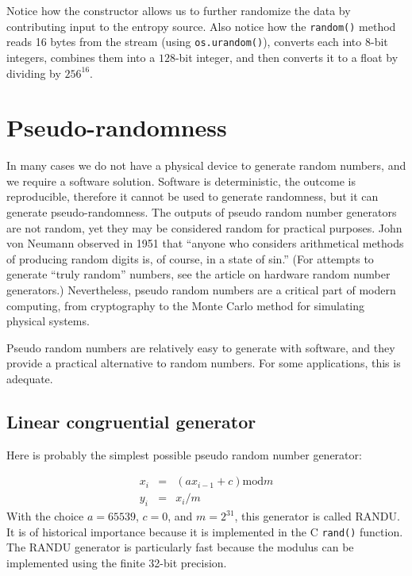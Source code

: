 \documentclass[justified, sixbynine]{tufte-book}
\def\ft{\small\tt}
\theoremstyle{plain}%
\newtheorem * {corollary}{Corollary}
\theoremstyle{definition}
\theoremstyle{remark}
\newtheorem * {remark}{Remark}
\newtheorem * {note}{Note}
\begin{document}
\begin{fullwidth}
Notice how the constructor allows us to further randomize the data by contributing input to the entropy source. Also notice how the {\ft random()} method reads 16 bytes from the stream (using {\ft os.urandom()}), converts each into $8$-bit integers, combines them into a $128$-bit integer, and then converts it to a float by dividing by $256^{16}$.

\goodbreak\section{Pseudo-randomness}

In many cases we do not have a physical device to generate random numbers, 
and we require a software solution. Software is deterministic, the outcome
is reproducible, therefore it cannot be used to generate randomness, but it
can generate pseudo-randomness. The outputs of pseudo random number
generators are not random, yet they may be considered random for practical purposes.
John von Neumann observed in 1951 that ``anyone who
considers arithmetical methods of producing random digits is, of course, in
a state of sin.'' (For attempts to generate ``truly random'' numbers, see
the article on hardware random number generators.) Nevertheless, 
pseudo random numbers are a critical part of modern computing, from
cryptography to the Monte Carlo method for simulating physical systems.

Pseudo random numbers are relatively easy to generate with software, and they
provide a practical alternative to random numbers. For some applications, 
this is adequate.



\goodbreak\subsection{Linear congruential generator}

Here is probably the simplest possible pseudo random number generator:

\begin{eqnarray}
x_i &=&(a x_{i-1} + c) \textrm{mod}m \\
y_i &=&x_i/m
\end{eqnarray}
With the choice $a=65539$, $c=0$, and $m=2^{31}$, this generator is called RANDU. It is of historical importance
because it is implemented in the C {\ft rand()} function.
The RANDU generator is particularly fast because the modulus can
be implemented using the finite 32-bit precision.


\end{fullwidth}
\end{document}
